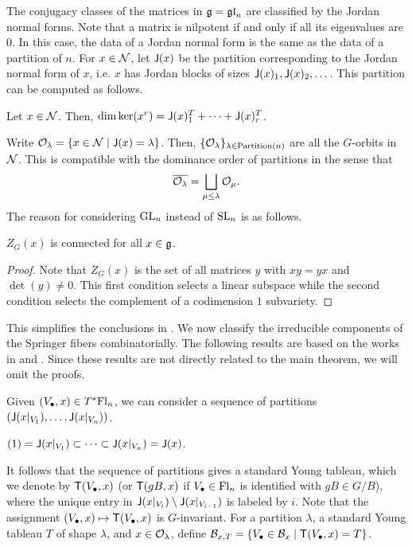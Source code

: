 The conjugacy classes of the matrices in $\mathfrak{g} = \mathfrak{gl}_n$ are classified by the Jordan normal forms. Note that a matrix is nilpotent if and only if all its eigenvalues are $0$. In this case, the data of a Jordan normal form is the same as the data of a partition of $n$. For $x \in \mathcal{N}$, let $\mathsf{J}(x)$ be the partition corresponding to the Jordan normal form of $x$, i.e. $x$ has Jordan blocks of sizes $\mathsf{J}(x)_1, \mathsf{J}(x)_2, \dots $. This partition can be computed as follows.
\begin{lemma}[lem:]{}
    Let $x \in \mathcal{N}$. Then, $ \dim \ker(x^r) = \mathsf{J}(x)^T_1 + \dots + \mathsf{J}(x)^T_r $.
\end{lemma}

Write $\mathcal{O}_\lambda = \{ x \in \mathcal{N} \mid \mathsf{J}(x) = \lambda \}$. Then, $\{\mathcal{O}_\lambda\}_{\lambda \in \text{Partition}(n)}$ are all the $G$-orbits in $\mathcal{N}$. This is compatible with the dominance order of partitions in the sense that
\begin{equation*}
    \overline{\mathcal{O}_{\lambda}} = \bigsqcup_{\mu \leq \lambda} \mathcal{O}_{\mu}.
\end{equation*}
The reason for considering $\mathrm{GL}_n$ instead of $\mathrm{SL}_n$ is as follows.
\begin{lemma}{}
    $Z_G(x)$ is connected for all $x \in \mathfrak{g}$.
    \begin{proof}
        Note that $Z_G(x)$ is the set of all matrices $y$ with $xy=yx$ and $\det(y) \neq 0$. This first condition selects a linear subspace while the second condition selects the complement of a codimension $1$ subvariety.
    \end{proof}
\end{lemma}

This simplifies the conclusions in . We now classify the irreducible components of the Springer fibers combinatorially. The following results are based on the works in \cite{steinberg1976} and \cite{steinberg1988}. Since these results are not directly related to the main theorem, we will omit the proofs.

Given $(V_\bullet, x) \in T^*\mathrm{Fl}_n$, we can consider a sequence of partitions $(\mathsf{J}(x|_{V_1}), \dots, \mathsf{J}(x|_{V_n}))$.

\begin{lemma}[lem:]{}
    $(1) = \mathsf{J}(x|_{V_1}) \subset \dots \subset \mathsf{J}(x|_{V_n}) = \mathsf{J}(x)$.
\end{lemma}

It follows that the sequence of partitions gives a standard Young tableau, which we denote by $\mathsf{T}(V_\bullet, x)$ (or $\mathsf{T}(gB, x)$ if $V_\bullet \in \mathrm{Fl}_n$ is identified with $gB \in G/B$), where the unique entry in $\mathsf{J}(x|_{V_i}) \setminus \mathsf{J}(x|_{V_{i-1}})$ is labeled by $i$. Note that the assignment $(V_\bullet, x) \mapsto \mathsf{T}(V_\bullet, x)$ is $G$-invariant. For a partition $\lambda$, a standard Young tableau $T$ of shape $\lambda$, and $x \in \mathcal{O}_\lambda$, define $\mathcal{B}_{x, T} = \{ V_\bullet \in \mathcal{B}_x \mid \mathsf{T}(V_\bullet, x) = T \}$.

